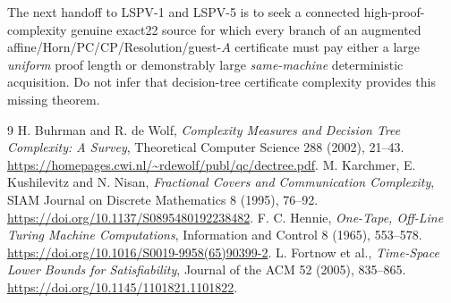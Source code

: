 \documentclass[11pt]{article}
\begin{document}
The next handoff to LSPV-1 and LSPV-5 is
to seek a connected high-proof-complexity genuine
exact22 source for which every branch of an
augmented affine/Horn/PC/CP/Resolution/guest-$A$
certificate must pay either a large \emph{uniform}
proof length or demonstrably large \emph{same-machine}
deterministic acquisition. Do not infer that
decision-tree certificate complexity provides
this missing theorem.

\begin{thebibliography}{9}
 H. Buhrman and R. de Wolf,
\emph{Complexity Measures and Decision Tree Complexity: A Survey},
Theoretical Computer Science 288 (2002), 21--43.
\url{https://homepages.cwi.nl/~rdewolf/publ/qc/dectree.pdf}.
 M. Karchmer, E. Kushilevitz and N. Nisan,
\emph{Fractional Covers and Communication Complexity},
SIAM Journal on Discrete Mathematics 8 (1995), 76--92.
\url{https://doi.org/10.1137/S0895480192238482}.
 F. C. Hennie,
\emph{One-Tape, Off-Line Turing Machine Computations},
Information and Control 8 (1965), 553--578.
\url{https://doi.org/10.1016/S0019-9958(65)90399-2}.
 L. Fortnow et al.,
\emph{Time-Space Lower Bounds for Satisfiability},
Journal of the ACM 52 (2005), 835--865.
\url{https://doi.org/10.1145/1101821.1101822}.
\end{thebibliography}
\end{document}
